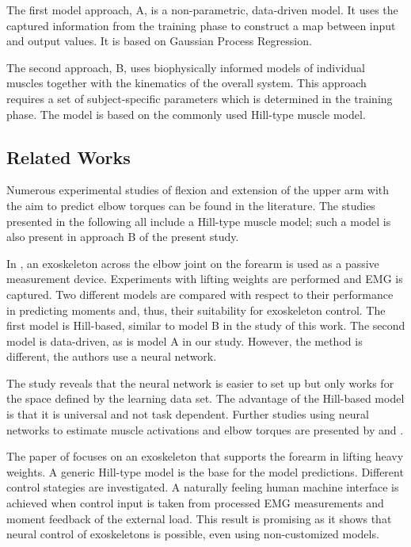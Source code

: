 The first model approach, A, is a non-parametric, data-driven model. It uses the captured information from the training phase to construct a map between input and output values. It is based on Gaussian Process Regression.

The second approach, B, uses biophysically informed models of individual muscles together with the kinematics of the overall system. This approach requires a set of subject-specific parameters which is determined in the training phase. The model is based on the commonly used Hill-type muscle model.

\subsection{Related Works}

%
Numerous experimental studies of flexion and extension of the upper arm with the aim to predict elbow torques can be found in the literature. The studies presented in the following all include a Hill-type muscle model; such a model is also present in approach B of the present study.

In \cite{Rosen1999}, an exoskeleton across the elbow joint on the forearm is used as a passive measurement device. Experiments with lifting weights are performed and EMG is captured.
Two different models are compared with respect to their performance in predicting moments and, thus, their suitability for exoskeleton control.
The first model is Hill-based, similar to model B in the study of this work.
The second model is data-driven, as is model A in our study. However, the method is different, the authors use a neural network.

The study reveals that the neural network is easier to set up but only works for the space defined by the learning data set. The advantage of the Hill-based model is that it is universal and not task dependent. 
Further studies using neural networks to estimate muscle activations and elbow torques are presented by \cite{Wang2002} and \cite{Song2005}.
%

The paper of \cite{Rosen2001} focuses on an exoskeleton that supports the forearm in lifting heavy weights. A generic Hill-type model is the base for the model predictions. Different control stategies are investigated. 
A naturally feeling human machine interface is achieved when
control input is taken from processed EMG measurements and moment feedback of the external load. 
This result is promising as it shows that neural control of exoskeletons is possible, even using non-customized models. 

